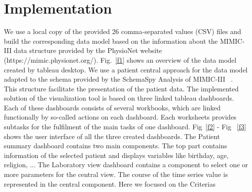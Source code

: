 \documentclass[aac]{iosart2x}
\begin{document}
\section{Implementation}\label{s4}
%
We use a local copy of the provided 26 comma-separated values (CSV) files and build the corresponding data model based on the information about the MIMIC-III data structure provided by the PhysioNet website (https://mimic.physionet.org/). Fig.~\ref{f1} shows an overview of the data model created by tableau desktop. We use a patient central approach for the data model adapted to the schema provided by the SchemaSpy Analysis of MIMIC-III ~\cite{SchemaSpy.2017}. This structure facilitate the presentation of the patient data. 
The implemented solution of the visualization tool is based on three linked tableau dashboards. Each of these dashboards consists of several workbooks, which are linked functionally by so-called actions on each dashboard. Each worksheets provides subtasks for the fulfilment of the main tasks of one dashboard. Fig~\ref{f2} - Fig ~\ref{f3} shows the user interface of all the three created dashboards.
The Patient summary dashboard contains two main components. The top part contains information of the selected patient and displays variables like birthday, age, religion, ...
The Laboratory view dashboard contains a component to select one or more parameters for the central view. The course of the time series value is represented in the central component. Here we focused on the Criterias 
\end{document}
